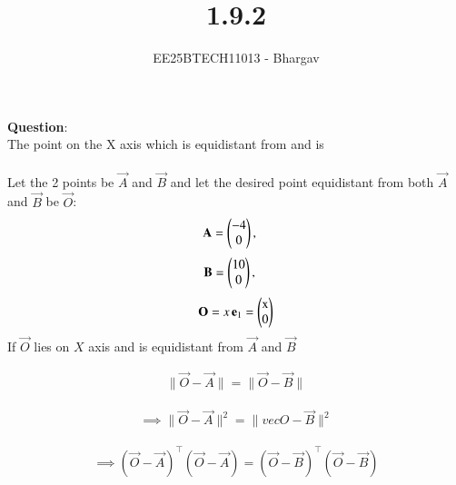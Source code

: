 \documentclass[journal]{IEEEtran}
\begin{document}

\vspace{3cm}

\title{1.9.2}
\author{EE25BTECH11013 - Bhargav}
\maketitle
{\let\newpage\relax\maketitle}

\renewcommand{\thefigure}{\theenumi}
\renewcommand{\thetable}{\theenumi}
\setlength{\intextsep}{10pt} %


\renewcommand{\thetable}{\theenumi}

\textbf{Question}:\\
The point on the X axis which is equidistant from  and  is\\ 
\solution \\
Let the 2 points be $\vec{A}$ and $\vec{B}$ and let the desired point equidistant from both $\vec{A}$ and $\vec{B}$ be $\vec{O}$:
\begin{align}
\mathbf{A}=\begin{pmatrix}-4 \\ 0\end{pmatrix},\quad
\end{align}
\begin{align}
\mathbf{B}=\begin{pmatrix}10 \\ 0\end{pmatrix},\quad
\end{align}
\begin{align}
\vec{O} = x\,\mathbf e_1= \myvec{$x$ \\ $0$}
\end{align}
If $\vec{O}$ lies on $X$ axis and is equidistant from $\vec{A}$ and $\vec{B}$



\begin{align}
\|\vec{O}-\vec{A}\|=\|\vec{O}-\vec{B}\|
\end{align}

\begin{align}
\implies \|\vec{O}-\vec{A}\|^2 = \|vec{O}-\vec{B}\|^2
\end{align}

\begin{align}
\implies (\vec{O}-\vec{A})^{\top}(\vec{O}-\vec{A}) = (\vec{O}-\vec{B})^{\top}(\vec{O}-\vec{B})
\end{align}
\end{document}
